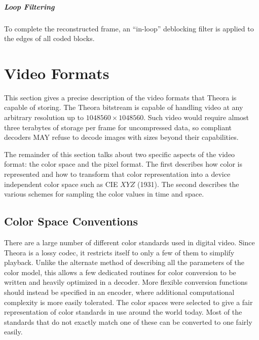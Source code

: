 \documentclass[9pt,letterpaper]{book}
\numberwithin{equation}{chapter}
\numberwithin{figure}{chapter}
\numberwithin{table}{chapter}
\begin{document}
\paragraph{Loop Filtering}

To complete the reconstructed frame, an ``in-loop'' deblocking filter is
 applied to the edges of all coded blocks.


\chapter{Video Formats}

This section gives a precise description of the video formats that Theora is
 capable of storing.
The Theora bitstream is capable of handling video at any arbitrary resolution
 up to $1048560\times 1048560$.
Such video would require almost three terabytes of storage per frame for
 uncompressed data, so compliant decoders MAY refuse to decode images with
 sizes beyond their capabilities.

The remainder of this section talks about two specific aspects of the video
 format: the color space and the pixel format.
The first describes how color is represented and how to transform that color
 representation into a device independent color space such as CIE $XYZ$ (1931).
The second describes the various schemes for sampling the color values in time
 and space.

\section{Color Space Conventions}

There are a large number of different color standards used in digital video.
Since Theora is a lossy codec, it restricts itself to only a few of them to
 simplify playback.
Unlike the alternate method of describing all the parameters of the color
 model, this allows a few dedicated routines for color conversion to be written
 and heavily optimized in a decoder.
More flexible conversion functions should instead be specified in an encoder,
 where additional computational complexity is more easily tolerated.
The color spaces were selected to give a fair representation of color standards
 in use around the world today.
Most of the standards that do not exactly match one of these can be converted
 to one fairly easily.
\end{document}
